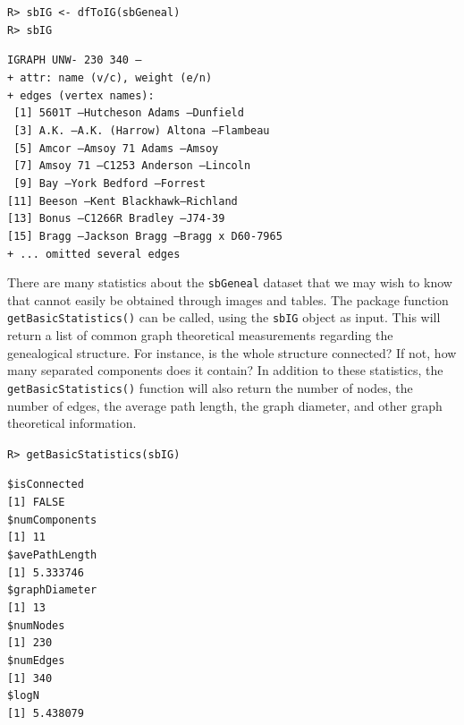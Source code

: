 \documentclass[11pt,a4paper,oldfontcommands,openany]{memoir}
\DeclareRobustCommand{\mybox}[2][gray!15]{%
\begin{tcolorbox}[   %
        breakable,
        left=0pt,
        right=0pt,
        top=0pt,
        bottom=0pt,
        colback=#1,
        colframe=#1,
        width=\dimexpr\textwidth\relax, 
        enlarge left by=0mm,
        boxsep=5pt,
        arc=0pt,outer arc=0pt,
        ]
        #2
\end{tcolorbox}
}
\numberwithin{equation}{section} %
\newcommand{\code}[1]{{\texttt{#1}}}
\begin{document}
\mybox{
\texttt{R> sbIG <- dfToIG(sbGeneal)}\\
\texttt{R> sbIG}
}

\mybox[green!10]{
\texttt{IGRAPH UNW- 230 340 -- }\\
\texttt{+ attr: name (v/c), weight (e/n)}\\
\texttt{+ edges (vertex names):}\\
\texttt{ [1] 5601T    --Hutcheson        Adams    --Dunfield} \\       
\texttt{ [3] A.K.     --A.K. (Harrow)    Altona   --Flambeau} \\       
\texttt{ [5] Amcor    --Amsoy 71         Adams    --Amsoy } \\         
\texttt{ [7] Amsoy 71 --C1253            Anderson --Lincoln   } \\     
\texttt{ [9] Bay      --York             Bedford  --Forrest  }\\       
\texttt{[11] Beeson   --Kent             Blackhawk--Richland } \\      
\texttt{[13] Bonus    --C1266R           Bradley  --J74-39  } \\       
\texttt{[15] Bragg    --Jackson          Bragg    --Bragg x D60-7965}\\
\texttt{+ ... omitted several edges}
}

There are many statistics about the \code{sbGeneal} dataset that we may wish to know that cannot easily be obtained through images and tables. The package function \code{getBasicStatistics()} can be called, using the \code{sbIG} object as input. This will return a list of common graph theoretical measurements regarding the genealogical structure. For instance, is the whole structure connected? If not, how many separated components does it contain? In addition to these statistics, the \code{getBasicStatistics()} function will also return the number of nodes, the number of edges, the average path length, the graph diameter, and other graph theoretical information.

\mybox{
\texttt{R> getBasicStatistics(sbIG)}
}

\mybox[green!10]{
\texttt{\$isConnected}\\
\texttt{[1] FALSE}\\

\texttt{\$numComponents}\\
\texttt{[1] 11}\\

\texttt{\$avePathLength}\\
\texttt{[1] 5.333746}\\

\texttt{\$graphDiameter}\\
\texttt{[1] 13}\\

\texttt{\$numNodes}\\
\texttt{[1] 230}\\

\texttt{\$numEdges}\\
\texttt{[1] 340}\\

\texttt{\$logN}\\
\texttt{[1] 5.438079}
}
\end{document}
